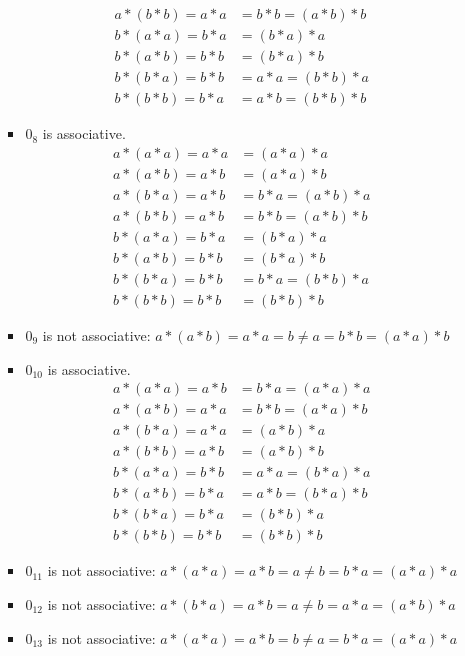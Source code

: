 \begin{enumerate}[label={\Alph*.},font={\bfseries}]
\begin{enumerate}[label={\arabic*},font={\bfseries}]
\begin{itemize}
\begin{align*}
              a*(b*b) = a*a &= b*b = (a*b)*b \\
              b*(a*a) = b*a &= (b*a)*a \\
              b*(a*b) = b*b &= (b*a)*b \\
              b*(b*a) = b*b &= a*a = (b*b)*a \\
              b*(b*b) = b*a &= a*b = (b*b)*b
            \end{align*}
          \item $0_8$ is associative.
            \begin{align*}
              a*(a*a) = a*a &= (a*a)*a \\
              a*(a*b) = a*b &= (a*a)*b \\
              a*(b*a) = a*b &= b*a = (a*b)*a \\
              a*(b*b) = a*b &= b*b = (a*b)*b \\
              b*(a*a) = b*a &= (b*a)*a \\
              b*(a*b) = b*b &= (b*a)*b \\
              b*(b*a) = b*b &= b*a = (b*b)*a \\
              b*(b*b) = b*b &= (b*b)*b
            \end{align*}
          \item $0_9$ is not associative: $a*(a*b)=a*a=b \neq a=b*b=(a*a)*b$
          \item $0_{10}$ is associative.
            \begin{align*}
              a*(a*a) = a*b &= b*a = (a*a)*a \\
              a*(a*b) = a*a &= b*b = (a*a)*b \\
              a*(b*a) = a*a &= (a*b)*a \\
              a*(b*b) = a*b &= (a*b)*b \\
              b*(a*a) = b*b &= a*a = (b*a)*a \\
              b*(a*b) = b*a &= a*b = (b*a)*b \\
              b*(b*a) = b*a &= (b*b)*a \\
              b*(b*b) = b*b &= (b*b)*b
            \end{align*}
          \item $0_{11}$ is not associative: $a*(a*a)=a*b=a \neq b=b*a=(a*a)*a$
          \item $0_{12}$ is not associative: $a*(b*a)=a*b=a \neq b=a*a=(a*b)*a$
          \item $0_{13}$ is not associative: $a*(a*a)=a*b=b \neq a=b*a=(a*a)*a$

\end{itemize}
\end{enumerate}
\end{enumerate}
